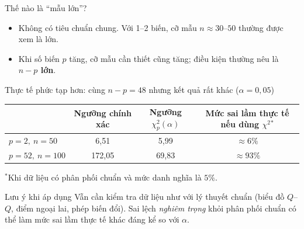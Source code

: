 \begin{frame}{Thế nào là ``mẫu lớn''?}
  \begin{itemize}
    \item Không có tiêu chuẩn chung. Với 1--2 biến, cỡ mẫu \(n\approx 30\)--\(50\) thường được xem là lớn.
    \item Khi số biến \(p\) tăng, cỡ mẫu cần thiết cũng tăng; điều kiện thường nêu là \textbf{\(n-p\) lớn}.
  \end{itemize}
  \begin{exampleblock}{Thực tế phức tạp hơn: cùng \(n-p=48\) nhưng kết quả rất khác (\(\alpha=0{,}05\))}
    \centering
    \footnotesize
    \setlength{\tabcolsep}{8pt}
    \begin{tabular}{@{}lccc@{}}
      \toprule
      & Ngưỡng chính xác & Ngưỡng \(\chi^2_p(\alpha)\) & Mức sai lầm thực tế nếu dùng \(\chi^2\)\({}^{*}\) \\
      \midrule
      \(p=2,\ n=50\)   & 6{,}51   & 5{,}99  & \(\approx 6\%\) \\
      \(p=52,\ n=100\) & 172{,}05 & 69{,}83 & \textcolor{hustred}{\(\approx 93\%\)} \\
      \bottomrule
    \end{tabular}\par\vspace{1pt}
    {\scriptsize\color{hustgray} \({}^{*}\)Khi dữ liệu có phân phối chuẩn và mức danh nghĩa là \(5\%\).\par}
  \end{exampleblock}
  \begin{alertblock}{Lưu ý khi áp dụng}
    \small
    Vẫn cần kiểm tra dữ liệu như với lý thuyết chuẩn (biểu đồ \(Q\)--\(Q\), điểm ngoại lai, phép biến đổi).
    Sai lệch \emph{nghiêm trọng} khỏi phân phối chuẩn có thể làm mức sai lầm thực tế khác đáng kể so với \(\alpha\).
  \end{alertblock}
\end{frame}

